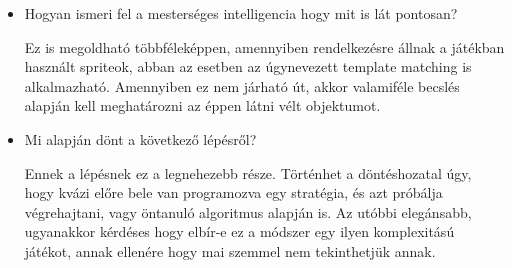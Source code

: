 \begin{itemize}
    \item Hogyan ismeri fel a mesterséges intelligencia hogy mit is lát pontosan?
    
    Ez is megoldható többféleképpen, amennyiben rendelkezésre állnak a játékban használt spriteok, abban az esetben az úgynevezett template matching is alkalmazható. Amennyiben ez nem járható út, akkor valamiféle becslés alapján kell meghatározni az éppen látni vélt objektumot.

    \item Mi alapján dönt a következő lépésről?
    
    Ennek a lépésnek ez a legnehezebb része. Történhet a döntéshozatal úgy, hogy kvázi előre bele van programozva egy stratégia, és azt próbálja végrehajtani, vagy öntanuló algoritmus alapján is. Az utóbbi elegánsabb, ugyanakkor kérdéses hogy elbír-e ez a módszer egy ilyen komplexitású játékot, annak ellenére hogy mai szemmel nem tekinthetjük annak. 
\end{itemize}




